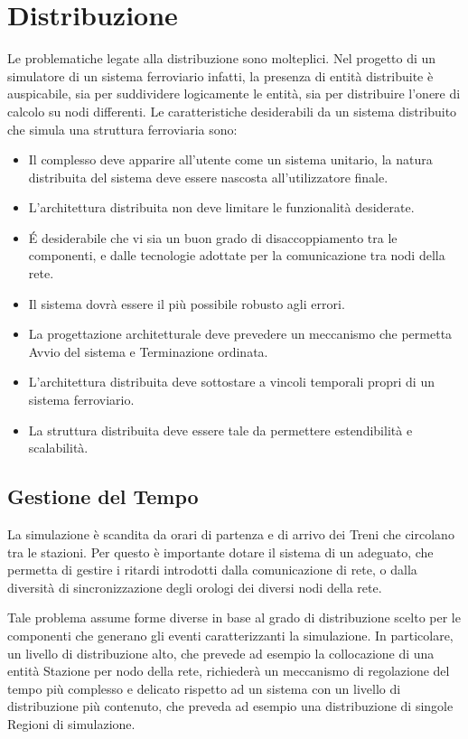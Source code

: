 \section{Distribuzione}

Le problematiche legate alla distribuzione sono molteplici. Nel progetto di un simulatore di un sistema ferroviario infatti, la presenza di entità distribuite è auspicabile, sia per suddividere logicamente le entità, sia per distribuire l'onere di calcolo su nodi differenti.
Le caratteristiche desiderabili da un sistema distribuito che simula una struttura ferroviaria sono:
	\begin{itemize}
		\item Il complesso deve apparire all'utente come un sistema unitario, la natura distribuita del sistema deve essere nascosta all'utilizzatore finale. 
		\item L'architettura distribuita non deve limitare le funzionalità desiderate.
		\item \'E desiderabile che vi sia un buon grado di disaccoppiamento tra le componenti, e dalle tecnologie adottate per la comunicazione tra nodi della rete.
		\item Il sistema dovrà essere il più possibile robusto agli errori.
		\item La progettazione architetturale deve prevedere un meccanismo che permetta Avvio del sistema e Terminazione ordinata.
		\item L'architettura distribuita deve sottostare a vincoli temporali propri di un sistema ferroviario.
		\item La struttura distribuita deve essere tale da permettere estendibilità e scalabilità.
	\end{itemize}

	\subsection{Gestione del Tempo}
	
	La simulazione è scandita da orari di partenza e di arrivo dei Treni che circolano tra le stazioni. Per questo è importante dotare il sistema di un  adeguato, che permetta di gestire i ritardi introdotti dalla comunicazione di rete, o dalla diversità di sincronizzazione degli orologi dei diversi nodi della rete.
	 
	Tale problema assume forme diverse in base al grado di distribuzione scelto per le componenti che generano gli eventi caratterizzanti la simulazione. In particolare, un livello di distribuzione alto, che prevede ad esempio la collocazione di una entità Stazione per nodo della rete, richiederà un meccanismo di regolazione del tempo più complesso e delicato rispetto ad un sistema con un livello di distribuzione più contenuto, che preveda ad esempio una distribuzione di singole Regioni di simulazione. 
	
